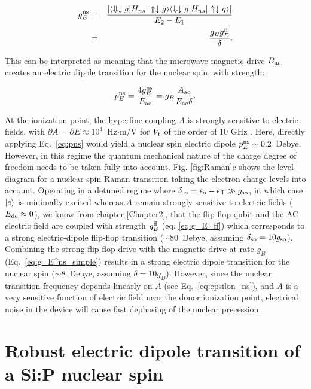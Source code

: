 \begin{eqnarray}
\label{eq:g_E^ns_simple}
g_E^{\rm ns} & = & \frac{\left|\langle \Downarrow \downarrow g| H_{ns} |\Uparrow \downarrow g\rangle \langle \Downarrow \downarrow g| H_{ns} |\Uparrow \downarrow g\rangle \right|}{E_{2}-E_{1}}\\
& = & \frac{g_B g_E^{\rm ff}}{\delta}.
\end{eqnarray} 

This can be interpreted as meaning that the microwave magnetic drive $B_{\rm ac}$ creates an electric dipole transition for the nuclear spin, with strength:

\begin{equation}
p_E^{\rm ns} = \frac{4 g_E^{\rm ns}}{E_{\rm ac}} = g_B \frac{A_{\rm ac}}{E_{\rm ac} \delta}.
\label{eq:pns}
\end{equation}

At the ionization point, the hyperfine coupling $A$ is strongly sensitive to electric fields, with $\partial A=\partial E \approx 10^4$~Hz$\cdot$m/V for $V_{\rm t}$ of the order of 10 GHz \cite{Tosi2017}. Here, directly applying Eq.~\ref{eq:pns} would yield a nuclear spin electric dipole $p_E^{\rm ns} \sim 0.2$~Debye. However, in this regime the quantum mechanical nature of the charge degree of freedom needs to be taken fully into account. 
Fig. \ref{fig:Raman}c shows the level diagram for a nuclear spin Raman transition taking the electron charge levels into account. Operating in a detuned regime where $\delta_{\rm so} = \epsilon_{\rm o} - \epsilon_{\rm ff} \gg g_{\rm so}$, in which case $|e\rangle$ is minimally excited whereas $A$ remain strongly sensitive to electric fields ($E_{\rm dc} \approx 0$), we know from chapter \ref{Chapter2}, that the flip-flop qubit and the AC electric field are coupled with strength $g_E^{\rm ff}$ (eq. \eqref{eq:g_E_ff}) which corresponds to a strong electric-dipole flip-flop transition ($\sim80$~Debye, assuming $\delta_{\rm so}=10g_{\rm so}$). Combining the strong flip-flop drive with the magnetic drive at rate $g_B$ (Eq.~\ref{eq:g_E^ns_simple}) results in a strong electric dipole transition for the nuclear spin ($\sim8$~Debye, assuming $\delta=10g_B$). However, since the nuclear transition frequency depends linearly on $A$ (see Eq.~\ref{eq:epsilon_ns}), and $A$ is a very sensitive function of electric field near the donor ionization point, electrical noise in the device will cause fast dephasing of the nuclear precession.


\section{Robust electric dipole transition of a Si:P nuclear spin} \label{sec:robust}

